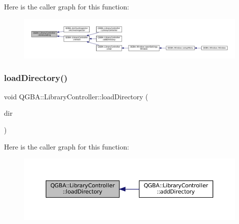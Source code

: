 Here is the caller graph for this function\+:
\nopagebreak
\begin{figure}[H]
\begin{center}
\leavevmode
\includegraphics[width=350pt]{class_q_g_b_a_1_1_library_controller_a5e615220cf4daf6560b4b15eb61d0298_icgraph}
\end{center}
\end{figure}
\mbox{\label{class_q_g_b_a_1_1_library_controller_a39fcdba5deb72ca89a3d26cc967a62a6}} 
\subsubsection{\texorpdfstring{load\+Directory()}{loadDirectory()}}
{\footnotesize\ttfamily void Q\+G\+B\+A\+::\+Library\+Controller\+::load\+Directory (\begin{DoxyParamCaption}\item[{const Q\+String \&}]{dir }\end{DoxyParamCaption})\hspace{0.3cm}{\ttfamily [private]}}

Here is the caller graph for this function\+:
\nopagebreak
\begin{figure}[H]
\begin{center}
\leavevmode
\includegraphics[width=350pt]{class_q_g_b_a_1_1_library_controller_a39fcdba5deb72ca89a3d26cc967a62a6_icgraph}
\end{center}
\end{figure}
\mbox{\label{class_q_g_b_a_1_1_library_controller_a41b89cf89ef004789161172657410379}} 
